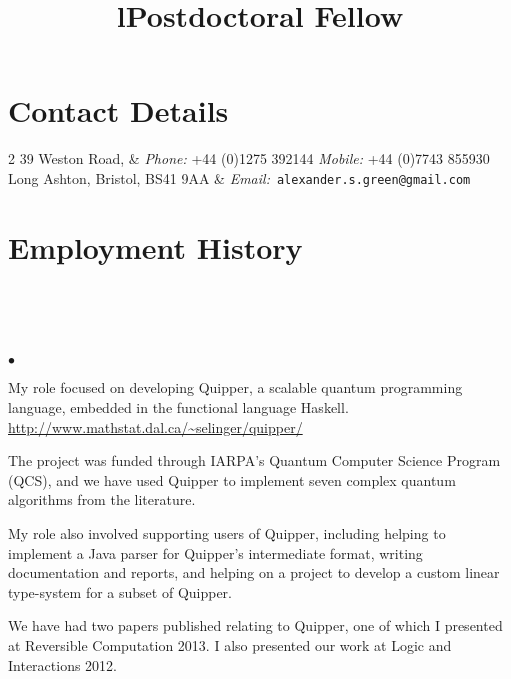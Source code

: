 \documentclass[line]{res}
\newenvironment{list2}{
  \begin{list}{$\bullet$}{%
      \setlength{\itemsep}{0in}
      \setlength{\parsep}{0.045in} \setlength{\parskip}{0in}
      \setlength{\topsep}{0in} \setlength{\partopsep}{0in}
      \setlength{\leftmargin}{0.2in}}}{\end{list}}
\begin{document}

\begin{resume}

\section{\sc Contact Details}
\begin{ncolumn}{2}
39 Weston Road, & {\it Phone:}  +44 (0)1275 392144 
   \hspace{3mm} {\it Mobile:}  +44 (0)7743 855930 \\
Long Ashton, Bristol, BS41 9AA & 
   {\it Email:}~\texttt{alexander.s.green@gmail.com} \\
\end{ncolumn}

\vspace{-4mm}
\section{\sc Employment History}
\begin{format}
\title{l}\\
\\
\body\\
\end{format}

\title{Postdoctoral Fellow}
\begin{position}
\vspace{-4mm}
\begin{list2}
\item My role focused on developing Quipper, a scalable quantum
  programming language, embedded in the functional language Haskell.
\url{http://www.mathstat.dal.ca/~selinger/quipper/}
\item The project was funded through IARPA's Quantum Computer 
 Science Program (QCS), and we have used Quipper to implement seven
 complex quantum algorithms from the literature.
\item My role also involved supporting users of Quipper, including
  helping to implement a Java parser for Quipper's intermediate format,
  writing documentation and reports, and helping on a project to
  develop a custom linear type-system for a subset of Quipper.
\item We have had two papers published relating to Quipper, one of
  which I presented at Reversible Computation 2013. I also presented
  our work at Logic and Interactions 2012. 
\end{list2}
\end{position}


\end{resume}
\end{document}
